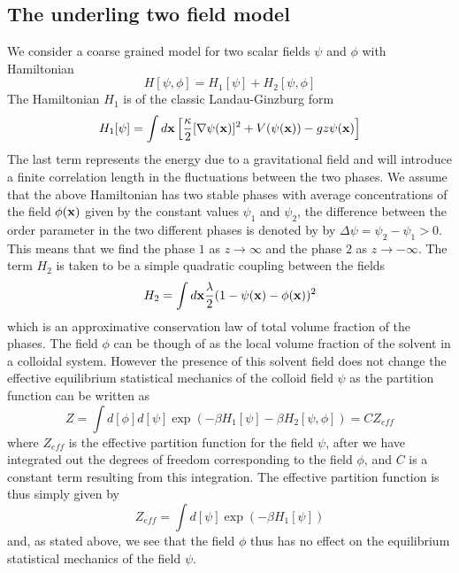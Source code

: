     \subsection{The underling two field  model}

We consider a coarse grained model for two scalar fields $\psi$ and $\phi$ with Hamiltonian
\begin{equation}
    H[\psi,\phi] = H_1[\psi] +H_2[\psi,\phi]
\end{equation}
The Hamiltonian $H_1$ is of the classic Landau-Ginzburg form
\begin{equation}
    H_1[\psi]=\int d{\bf x}\left[\frac{\kappa}{2}[\nabla\psi({\bf x})]^2 + V(\psi({\bf x}))
- gz \psi({\bf x})\right]
\end{equation}
The last term represents the energy due to a gravitational field and will introduce a finite correlation length in the fluctuations between the two phases. We assume that the above Hamiltonian has two stable phases with average concentrations of the field $\phi({\bf x})$ given by the constant values $\psi_1$ and $\psi_2$, the difference between the order parameter in  the two different phases is denoted by 
by $\Delta\psi= \psi_2 -\psi_1 \greater 0$. This means that we find the phase $1$ as $z\to\infty$ and the phase $2$ as $z\to-\infty$. The term $H_2$ is taken to be a simple quadratic coupling between the fields
\begin{equation}
    H_2 =\int d{\bf x} \frac{\lambda}{2}(1-\psi({\bf x})-\phi({\bf x}))^2
\end{equation}
which is an approximative conservation law of total volume fraction of the phases. The field $\phi$ can be though of as the local volume fraction of the solvent in a colloidal system. However the presence of this solvent field does not change the effective equilibrium statistical mechanics of the colloid field $\psi$ as the partition function can be written as 
\begin{equation}
    Z = \int d[\phi]d[\psi]\exp(-\beta H_1[\psi]- \beta H_2[\psi,\phi]) = CZ_{eff}
\end{equation}
where $Z_{eff}$ is the effective partition function for the field $\psi$, after we have integrated out the degrees of freedom corresponding to the field $\phi$,
and $C$ is a constant term resulting from this integration. The effective partition function is thus simply given by
\begin{equation}
    Z_{eff} = \int d[\psi]\exp(-\beta H_1[\psi])
\end{equation}
and, as stated above, we see that the field $\phi$ thus has no effect on the equilibrium statistical mechanics of the field $\psi$.

